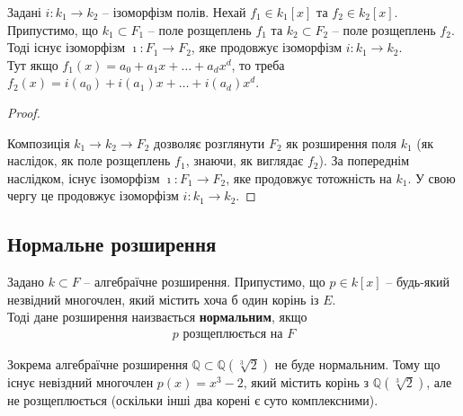 \documentclass{math_library}
\begin{document}
\begin{proposition}
Задані $i \colon k_1 \to k_2$ -- ізоморфізм полів. Нехай $f_1 \in k_1[x]$ та $f_2 \in k_2[x]$. Припустимо, що $k_1 \subset F_1$ -- поле розщеплень $f_1$ та $k_2 \subset F_2$ -- поле розщеплень $f_2$. Тоді існує ізоморфізм $\imath \colon F_1 \to F_2$, яке продовжує ізоморфізм $i \colon k_1 \to k_2$.\\
Тут якщо $f_1(x) = a_0 + a_1 x + \dots + a_d x^d$, то треба $f_2(x) = i(a_0) + i(a_1) x + \dots + i(a_d) x^d$.
\end{proposition}

\begin{proof}
\begin{figure}[H]
\centering
{}
\end{figure}
Композиція $k_1 \to k_2 \to F_2$ дозволяє розглянути $F_2$ як розширення поля $k_1$ (як наслідок, як поле розщеплень $f_1$, знаючи, як виглядає $f_2$). За попереднім наслідком, існує ізоморфізм $\imath \colon F_1 \to F_2$, яке продовжує тотожність на $k_1$. У свою чергу це продовжує ізоморфізм $i \colon k_1 \to k_2$.
\end{proof}

\subsection{Нормальне розширення}
\begin{definition}
Задано $k \subset F$ -- алгебраїчне розширення. Припустимо, що $p \in k[x]$ -- будь-який незвідний многочлен, який містить хоча б один корінь із $E$.\\
Тоді дане розширення наизвається \textbf{нормальним}, якщо
\begin{align*}
p \text{ розщеплюється на } F
\end{align*}
\end{definition}

\begin{example}
Зокрема алгебраїчне розширення $\mathbb{Q} \subset \mathbb{Q}(\sqrt[3]{2})$ не буде нормальним. Тому що існує невіздний многочлен $p(x) = x^3 - 2$, який містить корінь з $\mathbb{Q}(\sqrt[3]{2})$, але не розщеплюється (оскільки інші два корені є суто комплексними).
\end{example}
\end{document}
